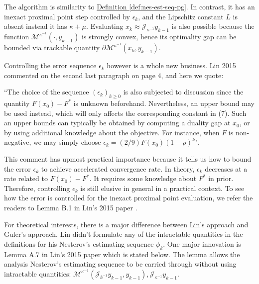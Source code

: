 \documentclass[12pt]{article}
\begin{document}
    \begin{remark}
        The algorithm is similarity to
        \hyperref[def:nes-est-seq-pg]{Definition \ref*{def:nes-est-seq-pg}}. 
        In contrast, it has an inexact proximal point step controlled by $\epsilon_k$, and the Lipschitz constant $L$ is absent instead it has $\kappa + \mu$. 
        Evaluating $x_k \approx \mathcal J_{\kappa^{-1}}y_{k - 1}$ is also possible because the function $\mathcal M^{\kappa^{-1}}(\cdot, y_{k - 1})$ is strongly convex, hence its optimality gap can be bounded via trackable quantity $\partial \mathcal M^{\kappa^{-1}}(x_k, y_{k - 1})$. 

        Controlling the error sequence $\epsilon_k$ however is a whole new business. 
        Lin 2015 \cite{lin_universal_2015} commented on the second last paragraph on page 4, and here we quote:
        \par
        ``The choice of the sequence $(\epsilon_k)_{k \ge 0}$ is also subjected to discussion since the quantity $F(x_0) - F^*$ is unknown beforehand. Nevertheless, an upper bound may be used instead, which will only affects the corresponding constant in (7). Such an upper bounds can typically be obtained by computing a duality gap at $x_0$, or by using additional knowledge about the objective. For instance, when $F$ is non-negative, we may simply choose $\epsilon_k = (2/9)F(x_0)(1 - \rho)^k$". 
        
        This comment has upmost practical importance because it tells us how to bound the error $\epsilon_k$ to achieve accelerated convergence rate. 
        In theory, $\epsilon_k$ decreases at a rate related to $F(x_0) - F^*$. 
        It requires some knowledge about $F^*$ in prior. 
        Therefore, controlling $\epsilon_k$ is still elusive in general in a practical context. 
        To see how the error is controlled for the inexact proximal point evaluation, we refer the readers to Lemma B.1 in Lin's 2015 paper \cite{lin_universal_2015}. 
    \end{remark}

    For theoretical interests, there is a major difference between Lin's approach and Guler's approach. 
    Lin didn't formulate any of the intractable quantities in the definitions for his Nesterov's estimating sequence $\phi_k$. 
    One major innovation is Lemma A.7 in Lin's 2015 paper \cite{lin_universal_2015} which is stated below. 
    The lemma allows the analysis Nesterov's estimating sequence to be carried through without using intractable quantities: $\mathcal M^{\kappa^{-1}}(\mathcal J_{k^{-1}}y_{k - 1}, y_{k - 1}), \mathcal J_{\kappa^{-1}}y_{k - 1}$. 
\end{document}
